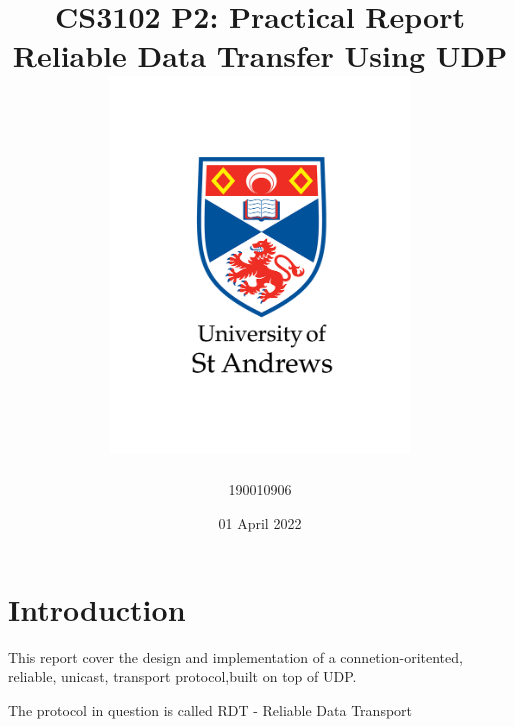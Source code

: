 \documentclass[12pt]{article}
\title{
{CS3102 P2: Practical Report}\\
{\large Reliable Data Transfer Using UDP}\\
{\includegraphics[width=80mm]{images/university-logo.png}}
}
\author{190010906}
\date{01 April 2022}
\begin{document}
\maketitle

\newpage

\section{Introduction}

This report cover the design and implementation of a connetion-oritented, reliable, unicast, transport protocol,built on top of UDP.

The protocol in question is called RDT - Reliable Data Transport











\newpage



\newpage

\end{document}
